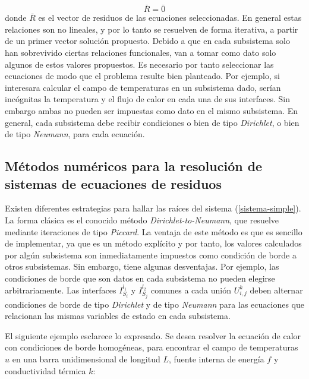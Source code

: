 \begin{equation}
\bar{R}=\bar{0}
\label{sistema-simple}
\end{equation}
donde $\bar{R}$ es el vector de residuos de las ecuaciones seleccionadas.
En general estas relaciones son no lineales, y por lo tanto se resuelven de forma iterativa, a partir de un primer vector solución propuesto.
Debido a que en cada subsistema solo han sobrevivido ciertas relaciones funcionales, 
van a tomar como dato solo algunos de estos valores propuestos.
Es necesario por tanto seleccionar las ecuaciones de modo que el problema resulte bien planteado.
Por ejemplo, si interesara calcular el campo de temperaturas en un subsistema dado,
serían incógnitas la temperatura y el flujo de calor en cada una de sus interfaces.
Sin embargo ambas no pueden ser impuestas como dato en el mismo subsistema.
En general, cada subsistema debe recibir condiciones o bien de tipo \textit{Dirichlet}, o bien de tipo \textit{Neumann}, para cada ecuación.

\subsection{Métodos numéricos para la resolución de sistemas de ecuaciones de residuos}
\label{1:metodos}
Existen diferentes estrategias para hallar las raíces del sistema (\ref{sistema-simple}). 
La forma clásica es el conocido método \textit{Dirichlet-to-Neumann}, que resuelve mediante iteraciones de tipo \textit{Piccard}. La ventaja de este método es que es sencillo de implementar, ya que es un método explícito y por tanto, los valores calculados por algún subsistema son inmediatamente impuestos como condición de borde a otros subsistemas.
Sin embargo, tiene algunas desventajas.
Por ejemplo, las condiciones de borde que son datos en cada subsistema no pueden elegirse arbitrariamente. 
Las interfaces $I_{S_i}^{l_1}$ y $I_{S_j}^{l_2}$ comunes a cada unión $U_{i,j}^k$ 
deben alternar condiciones de borde de tipo \textit{Dirichlet} y de tipo \textit{Neumann} para las ecuaciones que relacionan las mismas variables de estado en cada subsistema.

El siguiente ejemplo esclarece lo expresado. Se desea resolver la ecuación de calor con condiciones de borde homogéneas, para encontrar el campo de temperaturas $u$ en una barra unidimensional de longitud $L$, fuente interna de energía $f$ y conductividad térmica $k$:

